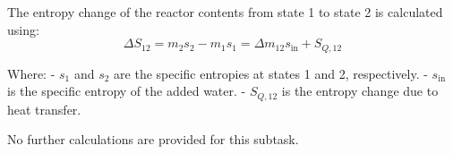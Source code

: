 The entropy change of the reactor contents from state 1 to state 2 is calculated using:  
\[
\Delta S_{12} = m_2 s_2 - m_1 s_1 = \Delta m_{12} s_{\text{in}} + S_{Q,12}
\]  

Where:  
- \( s_1 \) and \( s_2 \) are the specific entropies at states 1 and 2, respectively.  
- \( s_{\text{in}} \) is the specific entropy of the added water.  
- \( S_{Q,12} \) is the entropy change due to heat transfer.  

No further calculations are provided for this subtask.